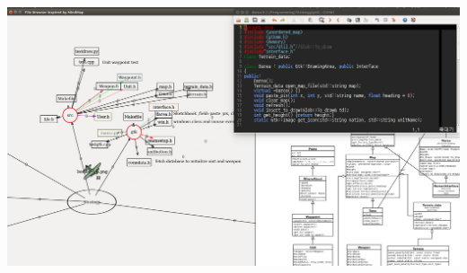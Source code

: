 \documentclass[12pt,a4paper]{article}
\begin{document}
\includegraphics[width=\textwidth]{2.png}
\end{document}
